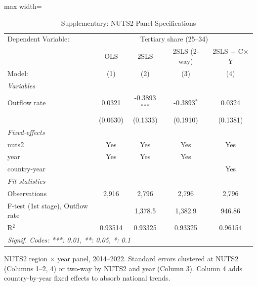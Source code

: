 \begin{table}[htbp]
   \caption{\label{tab:nuts2_panel} Supplementary: NUTS2 Panel Specifications}
   \centering
   \scriptsize
   \begin{adjustbox}{max width=\textwidth}
   \begin{tabular}{lcccc}
      \tabularnewline \midrule \midrule
      Dependent Variable: & \multicolumn{4}{c}{Tertiary share (25--34)}\\
                                       & OLS      & 2SLS            & 2SLS (2-way)  & 2SLS + C$\times$Y \\    
      Model:                           & (1)      & (2)             & (3)           & (4)\\  
      \midrule
      \emph{Variables}\\
      Outflow rate                     & 0.0321   & -0.3893$^{***}$ & -0.3893$^{*}$ & 0.0324\\   
                                       & (0.0630) & (0.1333)        & (0.1910)      & (0.1381)\\   
      \midrule
      \emph{Fixed-effects}\\
      nuts2                            & Yes      & Yes             & Yes           & Yes\\  
      year                             & Yes      & Yes             & Yes           & \\  
      country-year                     &          &                 &               & Yes\\  
      \midrule
      \emph{Fit statistics}\\
      Observations                     & 2,916    & 2,796           & 2,796         & 2,796\\  
      F-test (1st stage), Outflow rate &          & 1,378.5         & 1,382.9       & 946.86\\  
      R$^2$                            & 0.93514  & 0.93325         & 0.93325       & 0.96154\\  
      \midrule \midrule
      \multicolumn{5}{l}{\emph{Signif. Codes: ***: 0.01, **: 0.05, *: 0.1}}\\
   \end{tabular}
   \end{adjustbox}
   
   \par \raggedright 
   NUTS2 region $\times$ year panel, 2014--2022. Standard errors clustered at NUTS2 (Columns 1--2, 4) or two-way by NUTS2 and year (Column 3). Column 4 adds country-by-year fixed effects to absorb national trends.
\end{table}
